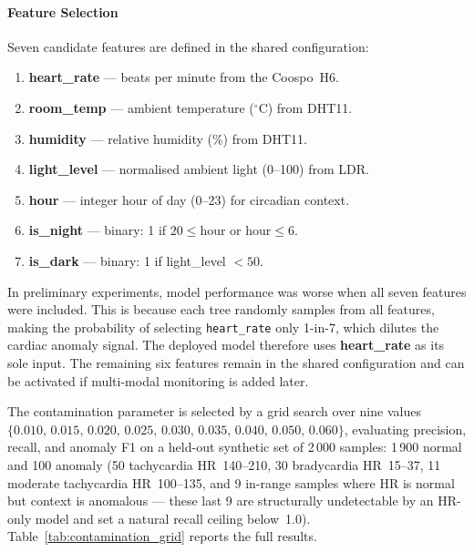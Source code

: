 \paragraph{Feature Selection}

Seven candidate features are defined in the shared configuration:

\begin{enumerate}
    \item \textbf{heart\_rate} --- beats per minute from the Coospo~H6.
    \item \textbf{room\_temp} --- ambient temperature ($^\circ$C) from DHT11.
    \item \textbf{humidity} --- relative humidity (\%) from DHT11.
    \item \textbf{light\_level} --- normalised ambient light (0--100) from LDR.
    \item \textbf{hour} --- integer hour of day (0--23) for circadian context.
    \item \textbf{is\_night} --- binary: 1 if $20 \leq \text{hour}$ or $\text{hour} \leq 6$.
    \item \textbf{is\_dark} --- binary: 1 if light\_level $< 50$.
\end{enumerate}

In preliminary experiments, model performance was worse when all seven features were included. This is because each tree randomly samples from all features, making the probability of selecting \texttt{heart\_rate} only 1-in-7, which dilutes the cardiac anomaly signal. The deployed model therefore uses \textbf{heart\_rate} as its sole input. The remaining six features remain in the shared configuration and can be activated if multi-modal monitoring is added later.

The contamination parameter is selected by a grid search over nine values $\{0.010,\,0.015,\,0.020,\,0.025,\,0.030,\,0.035,\,0.040,\,0.050,\,0.060\}$, evaluating precision, recall, and anomaly F1 on a held-out synthetic set of 2\,000 samples: 1\,900 normal and 100 anomaly (50 tachycardia HR~140--210, 30 bradycardia HR~15--37, 11 moderate tachycardia HR~100--135, and 9 in-range samples where HR is normal but context is anomalous --- these last 9 are structurally undetectable by an HR-only model and set a natural recall ceiling below~1.0). Table~\ref{tab:contamination_grid} reports the full results.

